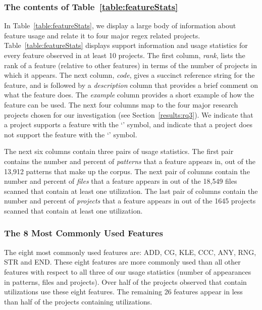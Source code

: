 \subsubsection{The contents of Table~\ref{table:featureStats}}
In Table~\ref{table:featureStats}, we display a large body of information about feature usage and relate it to four major regex related projects.  Table~\ref{table:featureStats} displays support information and usage statistics for every feature observed in at least 10 projects.
The first column, \emph{rank}, lists the rank of a feature (relative to other features) in terms of the number of projects in which it appears. The next column, \emph{code}, gives a succinct reference string for the feature, and is followed by a \emph{description} column that provides a brief comment on what the feature does.  The \emph{example} column provides a short example of how the feature can be used.
The next four columns map to the four major research projects chosen for our investigation (see Section~\ref{results:rq3}).  We indicate that a project supports a feature with the `\yes' symbol, and indicate that a project does not support the feature with the `\no' symbol.

The next six columns contain three pairs of usage statistics.  The first pair contains the number and percent of \emph{patterns} that a feature appears in, out of the 13,912 patterns that make up the corpus. The next pair of columns contain the number and percent of \emph{files} that a feature appears in out of the 18,549 files scanned that contain at least one utilization.  The last pair of columns contain the number and percent of \emph{projects} that a feature appears in out of the 1645 projects scanned that contain at least one utilization.

\subsubsection{The 8 Most Commonly Used Features}
The eight most commonly used features are: ADD, CG, KLE, CCC, ANY, RNG, STR and END.  These eight features are more commonly used than all other features with respect to all three of our usage statistics (number of appearances in patterns, files and projects).  Over half of the projects observed that contain utilizations use these eight features.  The remaining 26 features appear in less than half of the projects containing utilizations.

